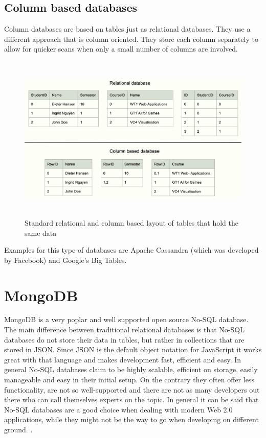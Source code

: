 \documentclass[11pt]{article}
\begin{document}
\subsection{Column based databases}
Column databases are based on tables just as relational databases. They use a different approach that is column oriented.
They store each column separately to allow for quicker scans when only a small number of columns are involved. 
\cite{columnbased} 
\begin{figure}[H]
	\centering 
	\includegraphics[height=8cm]{figures/column_based}     
	\caption{Standard relational and column based layout of tables that hold the same data}          
\end{figure}   
Examples for this type of databases are Apache Cassandra (which was developed by Facebook) and Google's Big Tables.
\section{MongoDB} 
MongoDB is a very poplar and well supported open source No-SQL database. The main difference between traditional relational databases is that No-SQL databases do not store their data in tables, but rather in collections that are stored in JSON. Since JSON is the default object notation for JavaScript it works great with that language and makes development fast, efficient and easy. In general No-SQL databases claim to be highly scalable, efficient on storage, easily manageable and easy in their initial setup. On the contrary they often offer less functionality, are not so well-supported and there are not as many developers out there who can call themselves experts on the topic. 
	In general it can be said that No-SQL databases are a good choice when dealing with modern Web 2.0 applications, while they might not be the way to go when developing on different ground. \cite{nosqladvantages}. 
	
\end{document}
